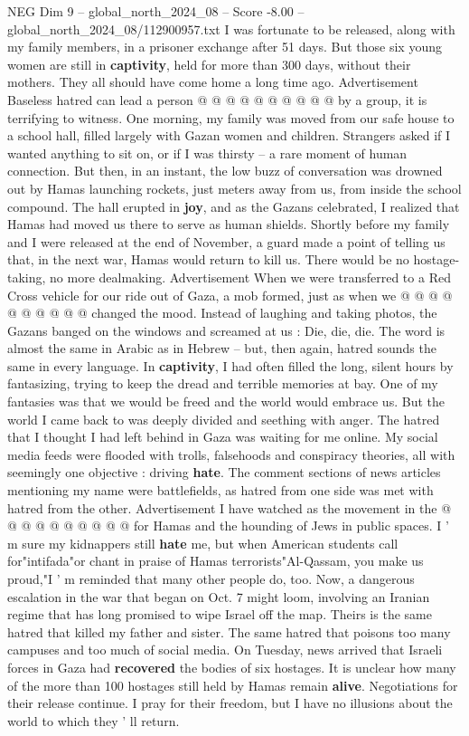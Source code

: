 \begin{textsample}{NEG Dim 9 – global\_north\_2024\_08 – Score -8.00 – global\_north\_2024\_08/112900957.txt}
I was fortunate to be released, along with my family members, in a prisoner exchange after 51 days.
But those six young women are still in \textbf{captivity}, held for more than 300 days, without their mothers.
They all should have come home a long time ago.
Advertisement Baseless hatred can lead a person @ @ @ @ @ @ @ @ @ @ by a group, it is terrifying to witness.
One morning, my family was moved from our safe house to a school hall, filled largely with Gazan women and children.
Strangers asked if I wanted anything to sit on, or if I was thirsty -- a rare moment of human connection.
But then, in an instant, the low buzz of conversation was drowned out by Hamas launching rockets, just meters away from us, from inside the school compound.
The hall erupted in \textbf{joy}, and as the Gazans celebrated, I realized that Hamas had moved us there to serve as human shields.
Shortly before my family and I were released at the end of November, a guard made a point of telling us that, in the next war, Hamas would return to kill us.
There would be no hostage-taking, no more dealmaking.
Advertisement When we were transferred to a Red Cross vehicle for our ride out of Gaza, a mob formed, just as when we @ @ @ @ @ @ @ @ @ @ changed the mood.
Instead of laughing and taking photos, the Gazans banged on the windows and screamed at us : Die, die, die.
The word is almost the same in Arabic as in Hebrew -- but, then again, hatred sounds the same in every language.
In \textbf{captivity}, I had often filled the long, silent hours by fantasizing, trying to keep the dread and terrible memories at bay.
One of my fantasies was that we would be freed and the world would embrace us.
But the world I came back to was deeply divided and seething with anger.
The hatred that I thought I had left behind in Gaza was waiting for me online.
My social media feeds were flooded with trolls, falsehoods and conspiracy theories, all with seemingly one objective : driving \textbf{hate}.
The comment sections of news articles mentioning my name were battlefields, as hatred from one side was met with hatred from the other.
Advertisement I have watched as the movement in the @ @ @ @ @ @ @ @ @ @ for Hamas and the hounding of Jews in public spaces.
I ' m sure my kidnappers still \textbf{hate} me, but when American students call for"intifada"or chant in praise of Hamas terrorists"Al-Qassam, you make us proud,"I ' m reminded that many other people do, too.
Now, a dangerous escalation in the war that began on Oct. 7 might loom, involving an Iranian regime that has long promised to wipe Israel off the map.
Theirs is the same hatred that killed my father and sister.
The same hatred that poisons too many campuses and too much of social media.
On Tuesday, news arrived that Israeli forces in Gaza had \textbf{recovered} the bodies of six hostages.
It is unclear how many of the more than 100 hostages still held by Hamas remain \textbf{alive}.
Negotiations for their release continue.
I pray for their freedom, but I have no illusions about the world to which they ' ll return.

\end{textsample}
